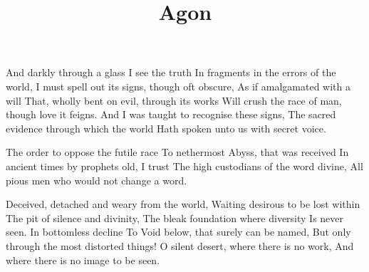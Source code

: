 \documentclass{article}
\title{Agon}
\newenvironment{stanza}{\begin{minipage}{10cm}\obeylines}{\end{minipage}\vspace{\baselineskip}}
\begin{document}
\maketitle

\clearpage


\begin{stanza}
And darkly through a glass I see the truth
In fragments in the errors of the world,
I must spell out its signs, though oft obscure,
As if amalgamated with a will
That, wholly bent on evil, through its works
Will crush the race of man, though love it feigns.
And I was taught to recognise these signs,
The sacred evidence through which the world
Hath spoken unto us with secret voice.
\end{stanza}

\begin{stanza}
The order to oppose the futile race
To nethermost Abyss, that was received
In ancient times by prophets old, I trust
The high custodians of the word divine,
All pious men who would not change a word.
\end{stanza}

\begin{stanza}
Deceived, detached and weary from the world,
Waiting desirous to be lost within
The pit of silence and divinity,
The bleak foundation where diversity
Is never seen. In bottomless decline
To Void below, that surely can be named,
But only through the most distorted things!
O silent desert, where there is no work,
And where there is no image to be seen.
\end{stanza}
\end{document}
